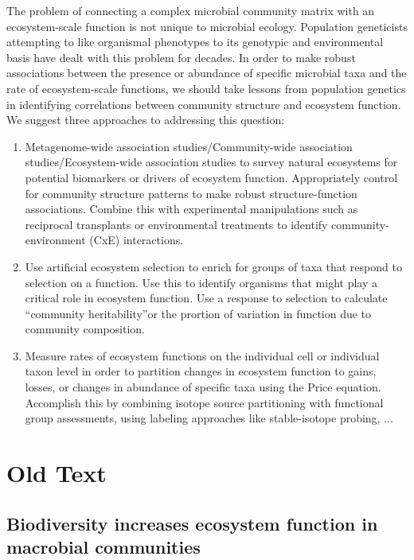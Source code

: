 \documentclass{article}
\begin{document}
The problem of
connecting a complex microbial community matrix with an ecosystem-scale function
is not unique to microbial ecology. Population geneticists attempting to like
organismal phenotypes to its genotypic and environmental basis have dealt with
this problem for decades. In order to make robust associations between the
presence or abundance of specific microbial taxa and the rate of ecosystem-scale
functions, we should take lessons from population genetics in identifying
correlations between community structure and ecosystem function. We suggest
three approaches to addressing this question:

\begin{enumerate}
  \item Metagenome-wide association studies/Community-wide association
    studies/Ecosystem-wide association studies to survey natural ecosystems
    for potential biomarkers or drivers of ecosystem function. Appropriately
    control for community structure patterns to make robust
    structure-function associations. Combine this
    with experimental manipulations such as reciprocal transplants or
    environmental treatments to identify community-environment (CxE)
    interactions.
  \item Use artificial ecosystem selection to enrich for groups of taxa that
    respond to selection on a function. Use this to identify organisms that
    might play a critical role in ecosystem function. Use a response to
    selection to calculate ``community heritability''or the prortion of
    variation in function due to community composition.
  \item Measure rates of ecosystem functions on the individual cell or
    individual taxon level in order to partition changes in ecosystem
    function to gains, losses, or changes in abundance of
    specific taxa using the Price equation. Accomplish this by combining
    isotope source partitioning with functional group assessments, using
    labeling approaches like stable-isotope probing, ...
\end{enumerate}


\section*{Old Text}

\subsection{Biodiversity increases ecosystem function in macrobial communities}
\end{document}
